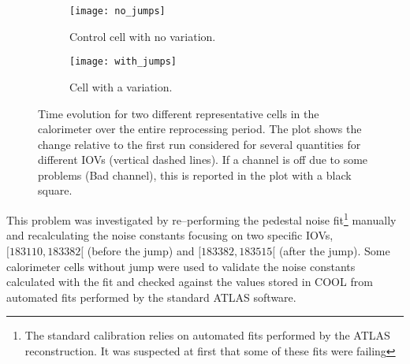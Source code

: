\begin{figure}[!h]
  \centering
  \begin{subfigure}[t]{.8\linewidth}
    \texttt{[image: no\_jumps]}
    \caption{Control cell with no variation.}
    \label{fig:no_jumps}
  \end{subfigure}
  \begin{subfigure}[t]{.8\linewidth}
    \texttt{[image: with\_jumps]}
    \caption{Cell with a variation.}
    \label{fig:with_jumps}
  \end{subfigure}
  \caption{Time evolution for two different representative cells in the
    calorimeter over the entire reprocessing period. The plot shows the change
    relative to the first run considered for several quantities for different
    IOVs (vertical dashed lines). If a channel is off due to some problems (Bad
    channel), this is reported in the plot with a black square.}
  \label{fig:jumps}
\end{figure}

This problem was investigated by re--performing the pedestal noise
fit\footnote{The standard calibration relies on automated fits performed by the
  ATLAS reconstruction. It was suspected at first that some of these fits were
  failing} manually and recalculating the noise constants focusing on two
specific IOVs, $[183110, 183382[$ (before the jump) and $[183382, 183515[$
(after the jump). Some calorimeter cells without jump were used to validate the
noise constants calculated with the fit and checked against the values stored in
COOL from automated fits performed by the standard ATLAS software.

